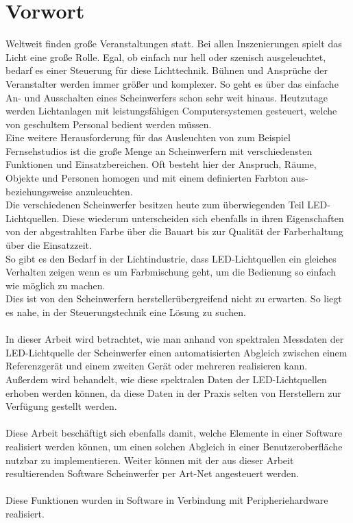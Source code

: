 \documentclass[11pt]{scrartcl}
\begin{document}
\section*{Vorwort}
Weltweit finden große Veranstaltungen statt. Bei allen Inszenierungen spielt das Licht eine
große Rolle. Egal, ob einfach nur hell oder szenisch ausgeleuchtet, bedarf es einer Steuerung
für diese Lichttechnik. Bühnen und Ansprüche der Veranstalter werden immer größer und komplexer.
So geht es über das einfache An- und Ausschalten eines Scheinwerfers schon sehr weit hinaus.
Heutzutage werden Lichtanlagen mit leistungsfähigen Computersystemen gesteuert, welche von
geschultem Personal bedient werden müssen.\\
Eine weitere Herausforderung für das Ausleuchten von zum Beispiel Fernsehstudios ist die große
Menge an Scheinwerfern mit verschiedensten Funktionen und Einsatzbereichen. Oft besteht hier
der Anspruch, Räume, Objekte und Personen homogen und mit einem definierten Farbton aus-
beziehungsweise anzuleuchten.\\
Die verschiedenen Scheinwerfer besitzen heute zum überwiegenden Teil LED-Lichtquellen. Diese
wiederum unterscheiden sich ebenfalls in ihren Eigenschaften von der abgestrahlten Farbe über
die Bauart bis zur Qualität der Farberhaltung über die Einsatzzeit.\\
So gibt es den Bedarf in der Lichtindustrie, dass LED-Lichtquellen ein gleiches Verhalten zeigen
wenn es um Farbmischung geht, um die Bedienung so einfach wie möglich zu machen.\\
Dies ist von den Scheinwerfern herstellerübergreifend nicht zu erwarten. So liegt es nahe, in der
Steuerungstechnik eine Lösung zu suchen.\\
\\
In dieser Arbeit wird betrachtet, wie man anhand von spektralen Messdaten der LED-Lichtquelle der
Scheinwerfer einen automatisierten Abgleich zwischen einem Referenzgerät und einem zweiten Gerät oder
mehreren realisieren kann.\\
Außerdem wird behandelt, wie diese spektralen Daten der LED-Lichtquellen erhoben werden können, da
diese Daten in der Praxis selten von Herstellern zur Verfügung gestellt werden.\\
\\
Diese Arbeit beschäftigt sich ebenfalls damit, welche Elemente in einer Software realisiert werden
können, um einen solchen Abgleich in einer Benutzeroberfläche nutzbar zu implementieren. Weiter
können mit der aus dieser Arbeit resultierenden Software Scheinwerfer per Art-Net angesteuert werden.\\
\\
Diese Funktionen wurden in Software in Verbindung mit Peripheriehardware realisiert.
\clearpage
\end{document}
